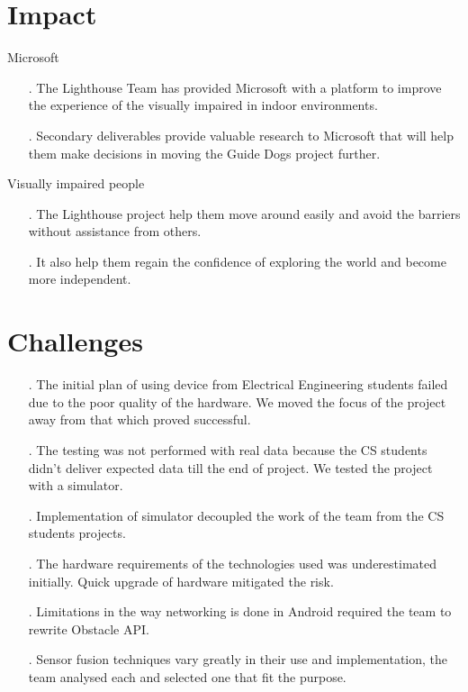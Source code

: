 \documentclass[prodmode,acmtosem]{acmsmall} %
\begin{document}
\section{Impact}
Microsoft
\begin{itemize}
\item[.] The Lighthouse Team has provided Microsoft with a platform to improve the experience of the visually impaired in indoor environments.
\item[.] Secondary deliverables provide valuable research to Microsoft that will help them make decisions in moving the Guide Dogs project further.
\end{itemize}
Visually impaired people
\begin{itemize}
\item[.] The Lighthouse project help them move around easily and avoid the barriers without assistance from others.
\item[.] It also help them regain the confidence of exploring the world and become more independent.
\end{itemize}

\section{Challenges}
\begin{itemize}
\item[.] The initial plan of using device from Electrical Engineering students failed due to the poor quality of the hardware. We moved the focus of the project away from that which proved successful.
\item[.] The testing was not performed with real data because the CS students didn't deliver expected data till the end of project. We tested the project with a simulator.
\item[.] Implementation of simulator decoupled the work of the team from the CS students projects.
\item[.] The hardware requirements of the technologies used was underestimated initially. Quick upgrade of hardware mitigated the risk.
\item[.] Limitations in the way networking is done in Android required the team to rewrite Obstacle API.
\item[.] Sensor fusion techniques vary greatly in their use and implementation, the team analysed each and selected one that fit the purpose.
\end{itemize}
\end{document}
